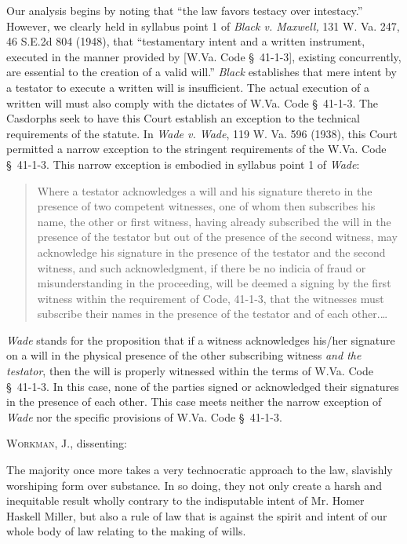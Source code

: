 Our analysis begins by noting that ``the law favors testacy over intestacy.''
However, we clearly held in syllabus point 1 of \textit{Black v. Maxwell, }131
W. Va. 247, 46 S.E.2d 804 (1948), that ``testamentary intent and a written
instrument, executed in the manner provided by [W.Va. Code {\S}~41-1-3],
existing concurrently, are essential to the creation of a valid will.''
\textit{Black} establishes that mere intent by a testator to execute a written
will is insufficient. The actual execution of a written will must also comply
with the dictates of W.Va. Code \S~41-1-3. The Casdorphs seek to have this
Court establish an exception to the technical requirements of the statute. In
\textit{Wade v. Wade}, 119 W. Va. 596 (1938), this Court permitted a narrow
exception to the stringent requirements of the W.Va. Code \S~41-1-3. This
narrow exception is embodied in syllabus point 1 of \textit{Wade}: 
\begin{quote}
Where a testator acknowledges a will and his signature thereto in the presence
of two competent witnesses, one of whom then subscribes his name, the other or
first witness, having already subscribed the will in the presence of the
testator but out of the presence of the second witness, may acknowledge his
signature in the presence of the testator and the second witness, and such
acknowledgment, if there be no indicia of fraud or misunderstanding in the
proceeding, will be deemed a signing by the first witness within the
requirement of Code, 41-1-3, that the witnesses must subscribe their names in
the presence of the testator and of each other.\dots
\end{quote}

\textit{Wade} stands for the proposition that if a witness acknowledges his/her
signature on a will in the physical presence of the other subscribing witness
\textit{and the testator}, then the will is properly witnessed within the terms
of W.Va. Code \S~41-1-3. In this case, none of the parties signed or
acknowledged their signatures in the presence of each other. This case meets
neither the narrow exception of \textit{Wade} nor the specific provisions of
W.Va. Code \S~41-1-3. 

\opinion \textsc{Workman}, J., dissenting: 

The majority once more takes a very technocratic approach to the law, slavishly
worshiping form over substance. In so doing, they not only create a harsh and
inequitable result wholly contrary to the indisputable intent of Mr. Homer
Haskell Miller, but also a rule of law that is against the spirit and intent of
our whole body of law relating to the making of wills. 

